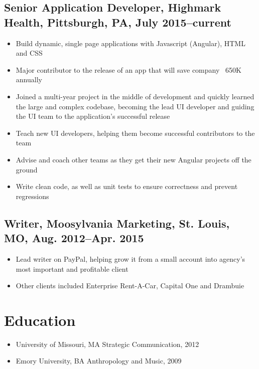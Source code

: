 \documentclass[11pt]{article}
\begin{document}
		\subsection{\normalsize{Senior Application Developer, Highmark Health, Pittsburgh, PA, July 2015--current}}
		\begin{itemize}[noitemsep]
		\item Build dynamic, single page applications with Javascript (Angular), HTML and CSS
		\item Major contributor to the release of an app that will save company ~650K annually
		\item Joined a multi-year project in the middle of development and quickly learned the large and complex codebase, becoming the lead UI developer and guiding the UI team to the application's successful release
		\item Teach new UI developers, helping them become successful contributors to the team
		\item Advise and coach other teams as they get their new Angular projects off the ground
		\item Write clean code, as well as unit tests to ensure correctness and prevent regressions
		\end{itemize}
		
	\subsection{\normalsize{Writer, Moosylvania Marketing, St. Louis, MO, Aug. 2012--Apr. 2015}}
	\begin{itemize}[noitemsep]
		\item Lead writer on PayPal, helping grow it from a small account into agency\rq s most important and profitable client
		\item Other clients included Enterprise Rent-A-Car, Capital One and Drambuie
	\end{itemize}
	
	\section{Education}
		\begin{itemize}[noitemsep]
			\item University of Missouri, MA Strategic Communication, 2012
			\item Emory University, BA Anthropology and Music, 2009
					
				
		\end{itemize}
	
\end{document}
